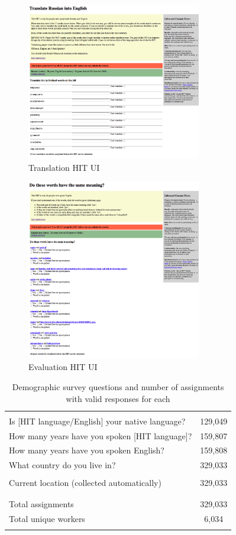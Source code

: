 \documentclass[11pt]{article}
\begin{document}
\begin{figure}[h]
\centering
\includegraphics[width=3in]{figures/vocabulary_hit_mturk}
\caption{Translation HIT UI}
\label{tranhit}
\end{figure}

\begin{figure}[h]
\centering
\includegraphics[width=3in]{figures/synonyms_hit_mturk}
\caption{Evaluation HIT UI}
\label{synhit}
\end{figure}

\begin{table}[h]
\centering
\begin{tabular}{lc}\hline\hline\\
Is [HIT language/English] your native language? &129,049\\
How many years have you spoken [HIT language]?&159,807\\
How many years have you spoken English?&159,808\\
What country do you live in?&329,033\\\\
Current location (collected automatically)& 329,033\\\\
\hline\\
Total assignments& 329,033\\
Total unique workers& 6,034\\\\
\hline\hline
\end{tabular}
\caption{Demographic survey questions and number of assignments with valid responses for each}
\label{survey-tab}
\end{table}
\end{document}
